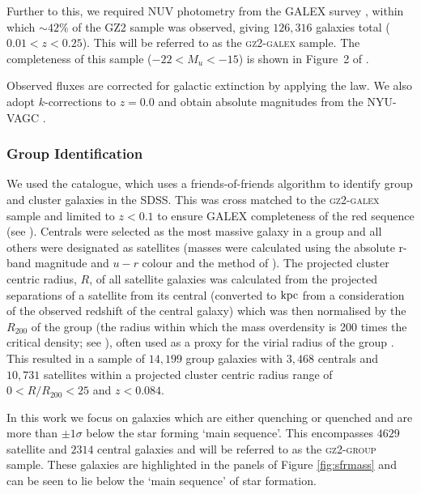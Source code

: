 \documentclass[useAMS,usenatbib]{mn2e}
\begin{document}
Further to this, we required NUV photometry from the GALEX survey \citep{martin05}, within which $\sim42\%$ of the GZ2 sample was observed, giving $126, 316$ galaxies total ($0.01 < z < 0.25$). This will be referred to as the \textsc{gz2-galex} sample. The completeness of this sample ($-22 < M_u < -15$) is shown in Figure~2 of \cite{smethurst15}. 

Observed fluxes are corrected for galactic extinction \citep{Oh11} by applying the \citet{cardelli89} law. We also adopt $k$-corrections to $z = 0.0$ and obtain absolute magnitudes from the NYU-VAGC \citep{blanton05, blanton07, padmanabhan08}.


\subsubsection{Group Identification}\label{sec:groups}

We used the \citet{berlind06} catalogue, which uses a friends-of-friends algorithm to identify group and cluster galaxies in the SDSS. This was cross matched to the \textsc{gz2-galex} sample and limited to $z < 0.1$ to ensure GALEX completeness of the red sequence (see \citealt{wyder07, yesuf14}). Centrals were selected as the most massive galaxy in a group and all others were designated as satellites (masses were calculated using the absolute r-band magnitude and $u-r$ colour and the method of \citealt{baldry06}).  The projected cluster centric radius, $R$, of all satellite galaxies was calculated from the projected separations of a satellite from its central (converted to $\rm{kpc}$ from a consideration of the observed redshift of the central galaxy) which was then normalised by the $R_{200}$ of the group (the radius within which the mass overdensity is 200 times the critical density; see \citealt{finn05}), often used as a proxy for the virial radius of the group \citep{navarro95}. This resulted in a sample of $14,199$ group galaxies with $3,468$ centrals and $10,731$ satellites within a projected cluster centric radius range of $0 < R/R_{200} < 25$ and $z < 0.084$. 

In this work we focus on galaxies which are either quenching or quenched and are more than $\pm1\sigma$ below the star forming `main sequence'. This encompasses $4629$ satellite and $2314$ central galaxies and will be referred to as the \textsc{gz2-group} sample. These galaxies are highlighted in the panels of Figure \ref{fig:sfrmass} and can be seen to lie below the `main sequence' of star formation. 
\end{document}
